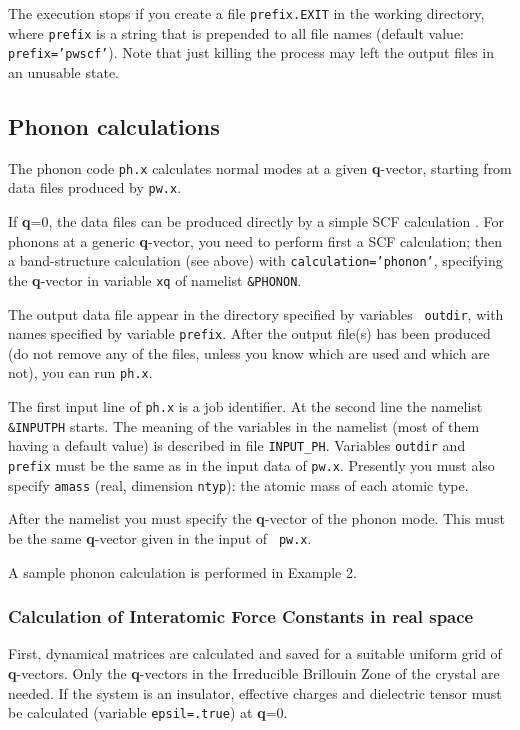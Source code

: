\documentclass[12pt]{article}
\begin{document}
The execution stops if you create a file {\tt prefix.EXIT} 
in the working directory, where {\tt prefix} is a string
that is prepended to all file names (default value:
{\tt prefix='pwscf'}). Note that just killing the process
may left the output files in an unusable state.

\subsection{Phonon calculations}

The phonon code {\tt ph.x} calculates normal modes at a given {\bf
q}-vector, starting from data files produced by {\tt pw.x}.

If {\bf q}=0, the data files can be produced directly by a simple SCF
calculation . For phonons at a generic {\bf q}-vector, you need to
perform first a SCF calculation; then a band-structure calculation (see
above) with {\tt calculation='phonon'}, specifying the {\bf q}-vector in
variable {\tt xq} of namelist {\tt \&PHONON}.

The output data file appear in the directory specified by variables {\tt
outdir}, with names specified by variable {\tt prefix}. After the output
file(s) has been produced (do not remove any of the files, unless you
know which are used and which are not), you can run {\tt ph.x}.

The first input line of {\tt ph.x} is a job identifier.  At the second
line the namelist {\tt \&INPUTPH} starts.  The meaning of the variables
in the namelist (most of them having a default value) is described in
file {\tt INPUT\_PH}.  Variables {\tt outdir} and {\tt prefix} must be
the same as in the input data of {\tt pw.x}.  Presently you must also
specify {\tt amass} (real, dimension {\tt ntyp}): the atomic mass of
each atomic type.

After the namelist you must specify the {\bf q}-vector of the phonon
mode. This must be the same {\bf q}-vector given in the input of {\tt
pw.x}.

A sample phonon calculation is performed in Example 2.

\subsubsection{Calculation of Interatomic Force Constants in real space}

First, dynamical matrices are calculated and saved for a suitable
uniform grid of {\bf q}-vectors. Only the {\bf q}-vectors in the
Irreducible Brillouin Zone of the crystal are needed. If the system is
an insulator, effective charges and dielectric tensor must be calculated
(variable {\tt epsil=.true}) at {\bf q}=0.
\end{document}
